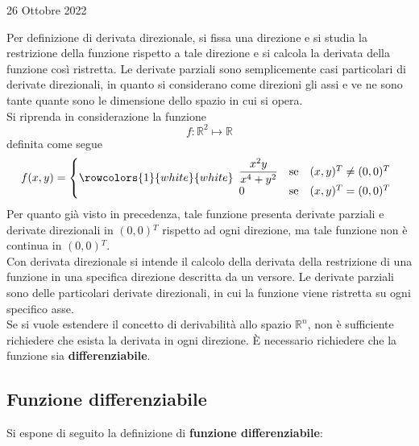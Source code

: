 \documentclass[a4paper]{extarticle}
\begin{document}
\newpage
\noindent
\begin{center}
    26 Ottobre 2022
\end{center}
Per definizione di derivata direzionale, si fissa una direzione e si studia la restrizione della funzione rispetto a tale direzione e si calcola la derivata della funzione così ristretta. Le derivate parziali sono semplicemente casi particolari di derivate direzionali, in quanto si considerano come direzioni gli assi e ve ne sono tante quante sono le dimensione dello spazio in cui si opera.\\
Si riprenda in considerazione la funzione
\[f:\mathbb{R}^2 \longmapsto \mathbb{R}\]
definita come segue
\[f(x,y) = \left\{
    \rowcolors{1}{white}{white}
    \begin{array}{lll}
        \dfrac{x^2y}{x^4+y^2} & \text{se} & (x,y){^T}\neq(0,0){^T}\\
        0 & \text{se} & (x,y){^T}=(0,0){^T}\\
    \end{array}
    \right.    
\]
Per quanto già visto in precedenza, tale funzione presenta derivate parziali e derivate direzionali in $(0,0){^T}$ rispetto ad ogni direzione, ma tale funzione non è continua in $(0,0){^T}$.\\
Con derivata direzionale si intende il calcolo della derivata della restrizione di una funzione in una specifica direzione descritta da un versore. Le derivate parziali sono delle particolari derivate direzionali, in cui la funzione viene ristretta su ogni specifico asse.\\
Se si vuole estendere il concetto di derivabilità allo spazio $\mathbb{R}^n$, non è sufficiente richiedere che esista la derivata in ogni direzione. È necessario richiedere che la funzione sia \textbf{differenziabile}.

\vspace{1em}
\noindent
\subsection{Funzione differenziabile}
Si espone di seguito la definizione di \textbf{funzione differenziabile}:
\end{document}
